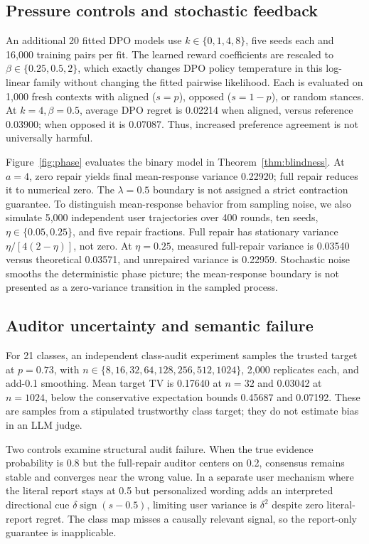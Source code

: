 \documentclass[10pt]{article}
\begin{document}
\subsection{Pressure controls and stochastic feedback}
An additional 20 fitted DPO models use $k\in\{0,1,4,8\}$, five seeds each and
16,000 training pairs per fit. The learned reward coefficients are rescaled to
$\beta\in\{0.25,0.5,2\}$, which exactly changes DPO policy temperature in this
log-linear family without changing the fitted pairwise likelihood. Each is
evaluated on 1,000 fresh contexts with aligned ($s=p$), opposed ($s=1-p$), or
random stances. At $k=4,\beta=0.5$, average DPO regret is 0.02214 when aligned,
versus reference 0.03900; when opposed it is 0.07087. Thus, increased
preference agreement is not universally harmful.

Figure~\ref{fig:phase} evaluates the binary model in
Theorem~\ref{thm:blindness}.
At $a=4$, zero repair yields final mean-response variance 0.22920; full repair
reduces it to numerical zero. The $\lambda=0.5$ boundary is not assigned a
strict contraction guarantee. To distinguish mean-response behavior from sampling noise, we also simulate 5,000 independent user trajectories over
400 rounds, ten seeds, $\eta\in\{0.05,0.25\}$, and five repair fractions.
Full repair has stationary variance $\eta/[4(2-\eta)]$, not zero. At
$\eta=0.25$, measured full-repair variance is 0.03540 versus theoretical
0.03571, and unrepaired variance is 0.22959. Stochastic noise smooths the
deterministic phase picture; the mean-response boundary is not presented as a
zero-variance transition in the sampled process.

\subsection{Auditor uncertainty and semantic failure}
For 21 classes, an independent class-audit experiment samples the trusted
target at $p=0.73$, with $n\in\{8,16,32,64,128,256,512,1024\}$, 2,000
replicates each, and add-0.1 smoothing. Mean target TV is 0.17640 at $n=32$
and 0.03042 at $n=1024$, below the conservative expectation bounds 0.45687
and 0.07192. These are samples from a stipulated trustworthy class target;
they do not estimate bias in an LLM judge.

Two controls examine structural audit failure. When the true evidence probability is
0.8 but the full-repair auditor centers on 0.2, consensus remains stable and
converges near the wrong value. In a separate user mechanism where the literal
report stays at 0.5 but personalized wording adds an interpreted directional
cue $\delta\operatorname{sign}(s-0.5)$, limiting user variance is
$\delta^2$ despite zero literal-report regret. The class map misses a causally
relevant signal, so the report-only guarantee is inapplicable.
\end{document}
